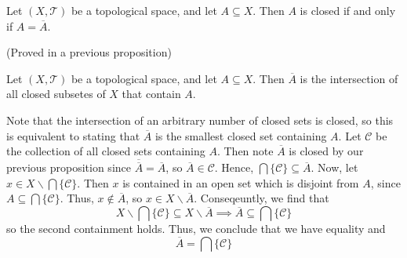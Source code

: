 \documentclass[12pt, a4paper, twoside, openright, titlepage]{book}
\begin{document}
\begin{prop}{}{}
    Let $(X,\mathcal{T})$ be a topological space, and let $A \subseteq X$. Then $A$ is closed if and only if $A = \overline{A}$.
\end{prop}
\begin{proof*}{}{}
    (Proved in a previous proposition)
\end{proof*}

\begin{prop}{}{}
    Let $(X,\mathcal{T})$ be a topological space, and let $A\subseteq X$. Then $\overline{A}$ is the intersection of all closed subsetes of $X$ that contain $A$.
\end{prop}
\begin{proof*}{}{}
    Note that the intersection of an arbitrary number of closed sets is closed, so this is equivalent to stating that $\overline{A}$ is the smallest closed set containing $A$. Let $\mathcal{C}$ be the collection of all closed sets containing $A$. Then note $\overline{A}$ is closed by our previous proposition since $\overline{\overline{A}} = \overline{A}$, so $\overline{A} \in \mathcal{C}$. Hence, $\bigcap\{\mathcal{C}\}\subseteq \overline{A}$. Now, let $x \in X\backslash\bigcap\{\mathcal{C}\}$. Then $x$ is contained in an open set which is disjoint from $A$, since $A \subseteq \bigcap\{\mathcal{C}\}$. Thus, $x \notin \overline{A}$, so $x \in X\backslash \overline{A}$. Conseqeuntly, we find that \begin{equation*}
        X\backslash\bigcap\{\mathcal{C}\} \subseteq X\backslash \overline{A} \implies \overline{A} \subseteq \bigcap\{\mathcal{C}\}
    \end{equation*}
    so the second containment holds. Thus, we conclude that we have equality and \begin{equation*}
        \overline{A} = \bigcap\{\mathcal{C}\}
    \end{equation*}
\end{proof*}
\end{document}

